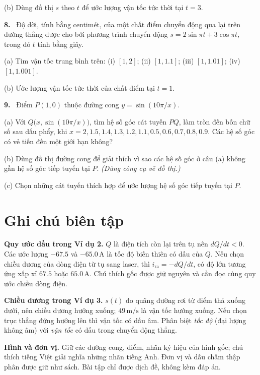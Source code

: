 \documentclass[12pt,a4paper]{article}
\newcommand{\bt}[1]{\par\smallskip\noindent\textbf{#1.}\ }
\begin{document}
(b) Dùng đồ thị $s$ theo $t$ để ước lượng vận tốc tức thời tại $t=3$.
\bt{8} Độ dời, tính bằng centimét, của một chất điểm chuyển động qua lại trên đường thẳng được cho bởi phương trình chuyển động $s=2\sin\pi t+3\cos\pi t$, trong đó $t$ tính bằng giây.

(a) Tìm vận tốc trung bình trên: (i) $[1,2]$; (ii) $[1,1.1]$; (iii) $[1,1.01]$; (iv) $[1,1.001]$.

(b) Ước lượng vận tốc tức thời của chất điểm tại $t=1$.
\bt{9} Điểm $P(1,0)$ thuộc đường cong $y=\sin(10\pi/x)$.

(a) Với $Q\bigl(x,\sin(10\pi/x)\bigr)$, tìm hệ số góc cát tuyến $PQ$, làm tròn đến bốn chữ số sau dấu phẩy, khi $x=2,1.5,1.4,1.3,1.2,1.1,0.5,0.6,0.7,0.8,0.9$. Các hệ số góc có vẻ tiến đến một giới hạn không?

(b) Dùng đồ thị đường cong để giải thích vì sao các hệ số góc ở câu (a) không gần hệ số góc tiếp tuyến tại $P$. \textit{(Dùng công cụ vẽ đồ thị.)}

(c) Chọn những cát tuyến thích hợp để ước lượng hệ số góc tiếp tuyến tại $P$.
\section*{Ghi chú biên tập}
\noindent\textbf{Quy ước dấu trong Ví dụ 2.} $Q$ là điện tích còn lại trên tụ nên $dQ/dt<0$. Các ước lượng $-67.5$ và $-65.0\,\mathrm A$ là tốc độ biến thiên có dấu của $Q$. Nếu chọn chiều dương của dòng điện từ tụ sang laser, thì $i_{\mathrm{ra}}=-dQ/dt$, có độ lớn tương ứng xấp xỉ $67.5$ hoặc $65.0\,\mathrm A$. Chú thích gốc được giữ nguyên và cần đọc cùng quy ước chiều dòng điện.

\noindent\textbf{Chiều dương trong Ví dụ 3.} $s(t)$ đo quãng đường rơi từ điểm thả xuống dưới, nên chiều dương hướng xuống; $49\,\mathrm{m/s}$ là vận tốc hướng xuống. Nếu chọn trục thẳng đứng hướng lên thì vận tốc có dấu âm. Phân biệt \textit{tốc độ} (đại lượng không âm) với \textit{vận tốc} có dấu trong chuyển động thẳng.

\noindent\textbf{Hình và đơn vị.} Giữ các đường cong, điểm, nhãn ký hiệu của hình gốc; chú thích tiếng Việt giải nghĩa những nhãn tiếng Anh. Đơn vị và dấu chấm thập phân được giữ như sách. Bài tập chỉ được dịch đề, không kèm đáp án.
\end{document}
